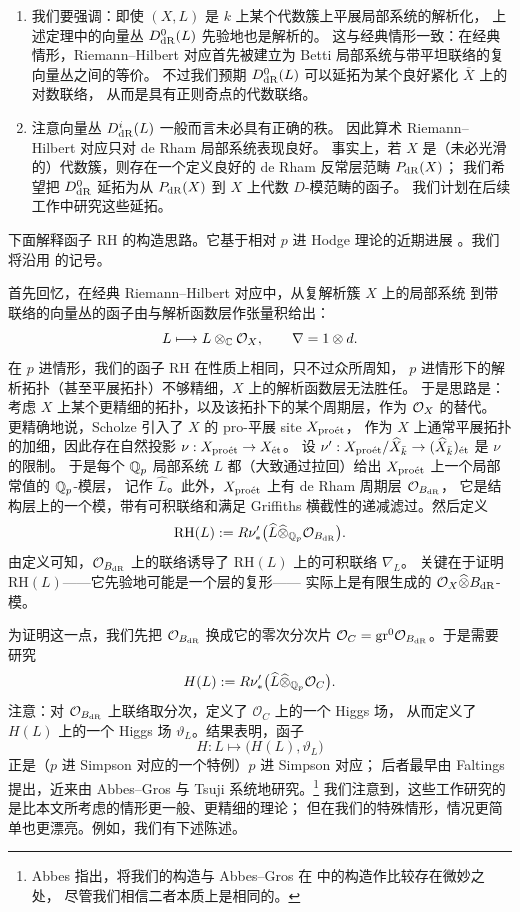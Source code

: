 \begin{rmk}\label{rmk:1.9}
\begin{enumerate}
\item 我们要强调：即使 $(X,L)$ 是 $k$ 上某个代数簇上平展局部系统的解析化，
上述定理中的向量丛 $D^0_{\mathrm{dR}}(L)$ 先验地也是解析的。
这与经典情形一致：在经典情形，Riemann--Hilbert 对应首先被建立为
Betti 局部系统与带平坦联络的复向量丛之间的等价。
不过我们预期 $D^0_{\mathrm{dR}}(L)$ 可以延拓为某个良好紧化 $\bar X$ 上的对数联络，
从而是具有正则奇点的代数联络。
\item 注意向量丛 $D^i_{\mathrm{dR}}(L)$ 一般而言未必具有正确的秩。
因此算术 Riemann--Hilbert 对应只对 de Rham 局部系统表现良好。
事实上，若 $X$ 是（未必光滑的）代数簇，则存在一个定义良好的 de Rham 反常层范畴 $P_{\mathrm{dR}}(X)$；
我们希望把 $D^0_{\mathrm{dR}}$ 延拓为从 $P_{\mathrm{dR}}(X)$ 到 $X$ 上代数 $D$-模范畴的函子。
我们计划在后续工作中研究这些延拓。
\end{enumerate}
\end{rmk}

下面解释函子 $\mathrm{RH}$ 的构造思路。它基于相对 $p$ 进 Hodge 理论的近期进展
\cite{Sch1,Sch2,KL1,KL2}。我们将沿用 \cite{Sch2} 的记号。

首先回忆，在经典 Riemann--Hilbert 对应中，从复解析簇 $X$ 上的局部系统
到带联络的向量丛的函子由与解析函数层作张量积给出：
\[
  L\longmapsto L\otimes_{\mathbb{C}}\mathcal{O}_X,\qquad \nabla=1\otimes d.
\]
在 $p$ 进情形，我们的函子 $\mathrm{RH}$ 在性质上相同，只不过众所周知，
$p$ 进情形下的解析拓扑（甚至平展拓扑）不够精细，$X$ 上的解析函数层无法胜任。
于是思路是：考虑 $X$ 上某个更精细的拓扑，以及该拓扑下的某个周期层，作为 $\mathcal{O}_X$ 的替代。
更精确地说，Scholze \cite{Sch2} 引入了 $X$ 的 pro-平展 site $X_{\text{pro\'et}}$，
作为 $X$ 上通常平展拓扑的加细，因此存在自然投影 $\nu:X_{\text{pro\'et}}\to X_{\text{\'et}}$。
设 $\nu':X_{\text{pro\'et}}/\widehat{X}_{\bar k}\to(\widehat{X}_{\bar k})_{\text{\'et}}$ 是 $\nu$ 的限制。
于是每个 $\mathbb{Q}_p$ 局部系统 $L$ 都（大致通过拉回）给出 $X_{\text{pro\'et}}$ 上一个局部常值的 $\mathbb{Q}_p$-模层，
记作 $\widehat L$。此外，$X_{\text{pro\'et}}$ 上有 de Rham 周期层 $\mathcal O_{B_{\mathrm{dR}}}$，
它是结构层上的一个模，带有可积联络和满足 Griffiths 横截性的递减滤过。然后定义
\[
  \mathrm{RH}(L):=R\nu'_*\bigl(\widehat L\widehat{\otimes}_{\mathbb{Q}_p}\mathcal O_{B_{\mathrm{dR}}}\bigr).
\]
由定义可知，$\mathcal O_{B_{\mathrm{dR}}}$ 上的联络诱导了 $\mathrm{RH}(L)$ 上的可积联络 $\nabla_L$。
关键在于证明 $\mathrm{RH}(L)$——它先验地可能是一个层的复形——
实际上是有限生成的 $\mathcal{O}_X\widehat{\otimes}B_{\mathrm{dR}}$-模。

为证明这一点，我们先把 $\mathcal O_{B_{\mathrm{dR}}}$ 换成它的零次分次片
$\mathcal O_C=\mathrm{gr}^0\mathcal O_{B_{\mathrm{dR}}}$。于是需要研究
\[
  H(L):=R\nu'_*\bigl(\widehat L\widehat{\otimes}_{\mathbb{Q}_p}\mathcal O_C\bigr).
\]
注意：对 $\mathcal O_{B_{\mathrm{dR}}}$ 上联络取分次，定义了 $\mathcal O_C$ 上的一个 Higgs 场，
从而定义了 $H(L)$ 上的一个 Higgs 场 $\vartheta_L$。结果表明，函子
\[
  H:L\longmapsto\bigl(H(L),\vartheta_L\bigr)
\]
正是（$p$ 进 Simpson 对应的一个特例）$p$ 进 Simpson 对应；
后者最早由 Faltings \cite{Fa} 提出，近来由 Abbes--Gros 与 Tsuji \cite{AG,AGT}
系统地研究。\footnote{%
Abbes 指出，将我们的构造与 Abbes--Gros 在 \cite{AGT} 中的构造作比较存在微妙之处，
尽管我们相信二者本质上是相同的。}
我们注意到，这些工作研究的是比本文所考虑的情形更一般、更精细的理论；
但在我们的特殊情形，情况更简单也更漂亮。例如，我们有下述陈述。


